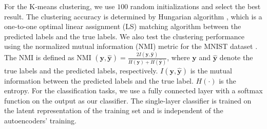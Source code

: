 \documentclass[letterpaper]{article} %
\begin{document}
For the K-means clustering, we use $100$ random initializations and select the best result. The clustering accuracy is determined by Hungarian algorithm \cite{xie:16:icml}, which is a one-to-one optimal linear assignment (LS) matching algorithm between the predicted labels and the true labels. We also test the clustering performance using the normalized mutual information (NMI) metric for the MNIST dataset \cite{Somvae} \cite{DBLP:journals/corr/abs-1801-07648}. The NMI is defined as NMI $(\mathbf{y}, \hat{\mathbf{y}}) = \frac{2I(\mathbf{y}, \hat{\mathbf{y}})}{H(\mathbf{y}) + H(\hat{\mathbf{y}})}$, where $\mathbf{y}$ and $\hat{\mathbf{y}}$ denote the true labels and the predicted labels, respectively. $I(\mathbf{y}, \hat{\mathbf{y}})$ is the mutual information between the predicted labels and the true label. $H(\cdot)$ is the entropy. For the classification tasks, we use a fully connected layer with a softmax function on the output as our classifier. The single-layer classifier is trained on the latent representation of the training set and is independent of the autoencoders' training.
\begin{table}[!ht]
\caption{Accuracy of downstream tasks of MNIST.}
\centering
{}
\label{MNIST_table}
\end{table}
\end{document}

